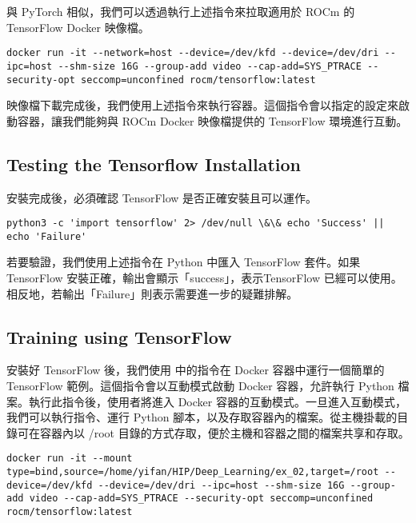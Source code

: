 與 PyTorch 相似，我們可以透過執行上述指令來拉取適用於 ROCm 的 TensorFlow Docker 映像檔。

\begin{lstlisting}[numbers=none, caption={啟動Docker容器的指令}, captionpos=t, label={lst:cmd_docker_act_tsf}]
docker run -it --network=host --device=/dev/kfd --device=/dev/dri --ipc=host --shm-size 16G --group-add video --cap-add=SYS_PTRACE --security-opt seccomp=unconfined rocm/tensorflow:latest
\end{lstlisting}

映像檔下載完成後，我們使用上述指令來執行容器。這個指令會以指定的設定來啟動容器，讓我們能夠與 ROCm Docker 映像檔提供的 TensorFlow 環境進行互動。

\subsection{Testing the Tensorflow Installation}

安裝完成後，必須確認 TensorFlow 是否正確安裝且可以運作。

\begin{lstlisting}[numbers=none, caption={使用Docker容器執行python腳本的指令}, captionpos=t, label={lst:cmd_docker_run_python}]
python3 -c 'import tensorflow' 2> /dev/null \&\& echo 'Success' || echo 'Failure'
\end{lstlisting}

若要驗證，我們使用上述指令在 Python 中匯入 TensorFlow 套件。如果 TensorFlow 安裝正確，輸出會顯示「success」，表示TensorFlow 已經可以使用。相反地，若輸出「Failure」則表示需要進一步的疑難排解。

\subsection{Training using TensorFlow}

安裝好 TensorFlow 後，我們使用  中的指令在 Docker 容器中運行一個簡單的 TensorFlow 範例。這個指令會以互動模式啟動 Docker 容器，允許執行 Python 檔案。執行此指令後，使用者將進入 Docker 容器的互動模式。一旦進入互動模式，我們可以執行指令、運行 Python 腳本，以及存取容器內的檔案。從主機掛載的目錄可在容器內以 /root 目錄的方式存取，便於主機和容器之間的檔案共享和存取。

\begin{lstlisting}[numbers=none, caption={啟動Docker容器的指令}, captionpos=t, label={lst:cmd_docker_act_tsttraining}]
docker run -it --mount type=bind,source=/home/yifan/HIP/Deep_Learning/ex_02,target=/root --device=/dev/kfd --device=/dev/dri --ipc=host --shm-size 16G --group-add video --cap-add=SYS_PTRACE --security-opt seccomp=unconfined rocm/tensorflow:latest
\end{lstlisting}

